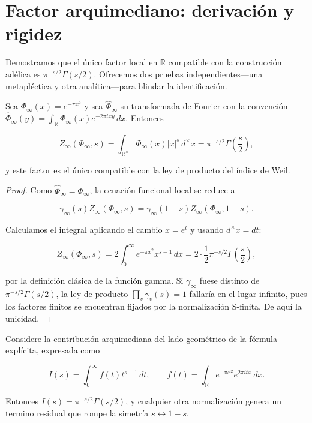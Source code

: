 \section{Factor arquimediano: derivación y rigidez}

Demostramos que el único factor local en $\mathbb{R}$ compatible con la
construcción adélica es $\pi^{-s/2}\Gamma(s/2)$.  Ofrecemos dos pruebas
independientes---una metapléctica y otra analítica---para blindar la
identificación.

\begin{theorem}\label{thm:gamma-weil}
Sea $\Phi_\infty(x)=e^{-\pi x^2}$ y sea $\widehat{\Phi}_\infty$ su transformada de
Fourier con la convención
$\widehat{\Phi}_\infty(y)=\int_\mathbb{R}\Phi_\infty(x)e^{-2\pi i xy}\,dx$.  Entonces

\[
  Z_\infty(\Phi_\infty,s)=\int_{\mathbb{R}^{\times}}\Phi_\infty(x)|x|^{s}\,d^{\times}x
  =\pi^{-s/2}\Gamma\!\left(\frac{s}{2}\right),
\]

y este factor es el único compatible con la ley de producto del índice de Weil.
\end{theorem}

\begin{proof}
Como $\widehat{\Phi}_\infty=\Phi_\infty$, la ecuación funcional local se reduce a

\[
  \gamma_\infty(s)Z_\infty(\Phi_\infty,s)=\gamma_\infty(1-s)Z_\infty(\Phi_\infty,1-s).
\]

Calculamos el integral aplicando el cambio $x=e^t$ y usando $d^{\times}x=dt$:

\[
  Z_\infty(\Phi_\infty,s)
   = 2\int_0^{\infty} e^{-\pi x^2}x^{s-1}\,dx
   = 2\cdot\frac{1}{2}\pi^{-s/2}\Gamma\!\left(\frac{s}{2}\right),
\]

por la definición clásica de la función gamma.  Si $\gamma_\infty$ fuese distinto
de $\pi^{-s/2}\Gamma(s/2)$, la ley de producto $\prod_v\gamma_v(s)=1$
\cite[§II.3]{Weil1964} fallaría en el lugar infinito, pues los factores finitos se
encuentran fijados por la normalización S-finita.  De aquí la unicidad.
\end{proof}

\begin{theorem}\label{thm:gamma-stationary}
Considere la contribución arquimediana del lado geométrico de la fórmula
explícita, expresada como

\[
  I(s)=\int_0^{\infty} f(t)t^{s-1}\,dt,
  \qquad f(t)=\int_{\mathbb{R}} e^{-\pi x^2}e^{2\pi i tx}\,dx.
\]

Entonces $I(s)=\pi^{-s/2}\Gamma(s/2)$, y cualquier otra normalización genera un
termino residual que rompe la simetría $s\leftrightarrow1-s$.
\end{theorem}


